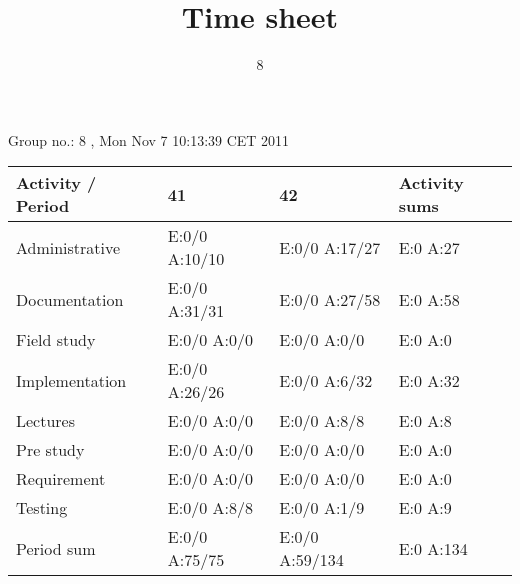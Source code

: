 \documentclass[a4paper]{article}
\title{Time sheet}
\author{8}
\begin{document}
\begin{landscape}
\begin{center}
	Group no.: 8
	, Mon Nov 7 10:13:39 CET 2011

	\begin{tabular}{| l | l | l | l |}
		\hline
		Activity / Period & 41 & 42 & Activity sums \\
		\hline \hline
		
Administrative & E:0/0 A:10/10 & E:0/0 A:17/27 & E:0 A:27 \\
Documentation & E:0/0 A:31/31 & E:0/0 A:27/58 & E:0 A:58 \\
Field study & E:0/0 A:0/0 & E:0/0 A:0/0 & E:0 A:0 \\
Implementation & E:0/0 A:26/26 & E:0/0 A:6/32 & E:0 A:32 \\
Lectures & E:0/0 A:0/0 & E:0/0 A:8/8 & E:0 A:8 \\
Pre study & E:0/0 A:0/0 & E:0/0 A:0/0 & E:0 A:0 \\
Requirement & E:0/0 A:0/0 & E:0/0 A:0/0 & E:0 A:0 \\
Testing & E:0/0 A:8/8 & E:0/0 A:1/9 & E:0 A:9 \\
Period sum & E:0/0 A:75/75 & E:0/0 A:59/134 & E:0 A:134 \\
		\hline
	\end{tabular}
\end{center}
\end{landscape}
\end{document}
